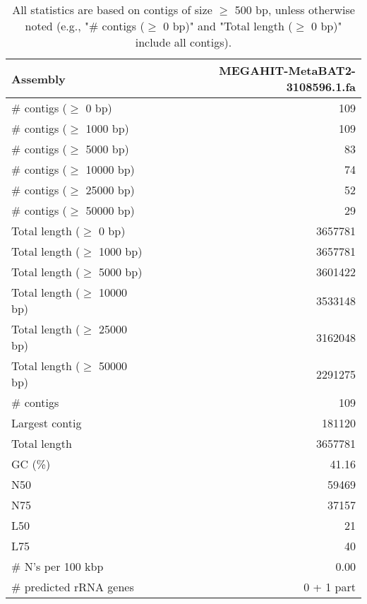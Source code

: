 \documentclass[12pt,a4paper]{article}
\begin{document}
\begin{table}[ht]
\begin{center}
\caption{All statistics are based on contigs of size $\geq$ 500 bp, unless otherwise noted (e.g., "\# contigs ($\geq$ 0 bp)" and "Total length ($\geq$ 0 bp)" include all contigs).}
\begin{tabular}{|l*{1}{|r}|}
\hline
Assembly & MEGAHIT-MetaBAT2-3108596.1.fa \\ \hline
\# contigs ($\geq$ 0 bp) & 109 \\ \hline
\# contigs ($\geq$ 1000 bp) & 109 \\ \hline
\# contigs ($\geq$ 5000 bp) & 83 \\ \hline
\# contigs ($\geq$ 10000 bp) & 74 \\ \hline
\# contigs ($\geq$ 25000 bp) & 52 \\ \hline
\# contigs ($\geq$ 50000 bp) & 29 \\ \hline
Total length ($\geq$ 0 bp) & 3657781 \\ \hline
Total length ($\geq$ 1000 bp) & 3657781 \\ \hline
Total length ($\geq$ 5000 bp) & 3601422 \\ \hline
Total length ($\geq$ 10000 bp) & 3533148 \\ \hline
Total length ($\geq$ 25000 bp) & 3162048 \\ \hline
Total length ($\geq$ 50000 bp) & 2291275 \\ \hline
\# contigs & 109 \\ \hline
Largest contig & 181120 \\ \hline
Total length & 3657781 \\ \hline
GC (\%) & 41.16 \\ \hline
N50 & 59469 \\ \hline
N75 & 37157 \\ \hline
L50 & 21 \\ \hline
L75 & 40 \\ \hline
\# N's per 100 kbp & 0.00 \\ \hline
\# predicted rRNA genes & 0 + 1 part \\ \hline
\end{tabular}
\end{center}
\end{table}
\end{document}
